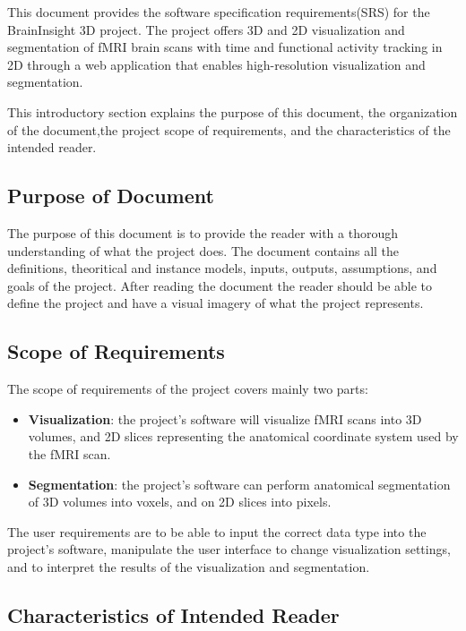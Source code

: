 \documentclass[12pt]{article}
\begin{document}
This document provides the software specification requirements(SRS) for the
BrainInsight 3D project. The project offers 3D and 2D visualization and segmentation
of fMRI brain scans with time and functional activity tracking in 2D through a
web application that enables high-resolution visualization and segmentation.

This introductory section explains the purpose of this document, the organization of
the document,the project scope of requirements, and the characteristics of the intended
reader.

\subsection{Purpose of Document}

The purpose of this document is to provide the reader with a thorough understanding
of what the project does. The document contains all the definitions, theoritical and
instance models, inputs, outputs, assumptions, and goals of the project. After reading
the document the reader should be able to define the project and have a visual imagery
of what the project represents.
\subsection{Scope of Requirements}

The scope of requirements of the project covers mainly two parts:
\begin{itemize}
  \item \textbf{Visualization}: the project's software will visualize fMRI scans into 3D volumes,
        and 2D slices representing the anatomical coordinate system used by the fMRI scan.
  \item \textbf{Segmentation}: the project's software can perform anatomical segmentation of 3D volumes into voxels,
        and on 2D slices into pixels.
\end{itemize}

The user requirements are to be able to input the correct data type into the project's
software, manipulate the user interface to change visualization settings, and to interpret
the results of the visualization and segmentation.


\subsection{Characteristics of Intended Reader} \label{sec_IntendedReader}
\end{document}
